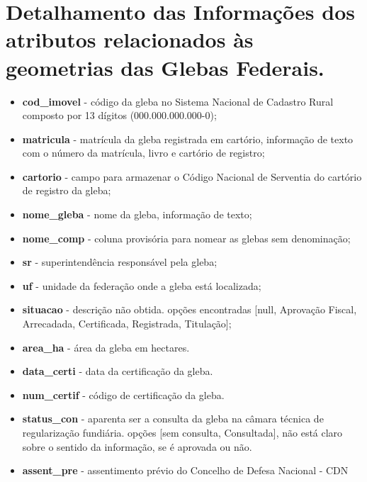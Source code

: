 \documentclass[
  letterpaper,
]{report}
\providecommand{\tightlist}{%
  \setlength{\itemsep}{0pt}\setlength{\parskip}{0pt}}\usepackage{longtable,booktabs,array}
\begin{document}

\hypertarget{detalhamento-das-informauxe7uxf5es-dos-atributos-relacionados-uxe0s-geometrias-das-glebas-federais.}{%
\chapter{Detalhamento das Informações dos atributos relacionados às
geometrias das Glebas
Federais.}\label{detalhamento-das-informauxe7uxf5es-dos-atributos-relacionados-uxe0s-geometrias-das-glebas-federais.}}

\begin{itemize}
\tightlist
\item
  \textbf{cod\_imovel} - código da gleba no Sistema Nacional de Cadastro
  Rural composto por 13 dígitos (000.000.000.000-0);
\item
  \textbf{matricula} - matrícula da gleba registrada em cartório,
  informação de texto com o número da matrícula, livro e cartório de
  registro;
\item
  \textbf{cartorio} - campo para armazenar o Código Nacional de
  Serventia do cartório de registro da gleba;
\item
  \textbf{nome\_gleba} - nome da gleba, informação de texto;
\item
  \textbf{nome\_comp} - coluna provisória para nomear as glebas sem
  denominação;
\item
  \textbf{sr} - superintendência responsável pela gleba;\\
\item
  \textbf{uf} - unidade da federação onde a gleba está localizada;\\
\item
  \textbf{situacao} - descrição não obtida. opções encontradas {[}null,
  Aprovação Fiscal, Arrecadada, Certificada, Registrada, Titulação{]};
\item
  \textbf{area\_ha} - área da gleba em hectares.
\item
  \textbf{data\_certi} - data da certificação da gleba.
\item
  \textbf{num\_certif} - código de certificação da gleba.
\item
  \textbf{status\_con} - aparenta ser a consulta da gleba na câmara
  técnica de regularização fundiária. opções {[}sem consulta,
  Consultada{]}, não está claro sobre o sentido da informação, se é
  aprovada ou não.
\item
  \textbf{assent\_pre} - assentimento prévio do Concelho de Defesa
  Nacional - CDN

\end{itemize}
\end{document}
